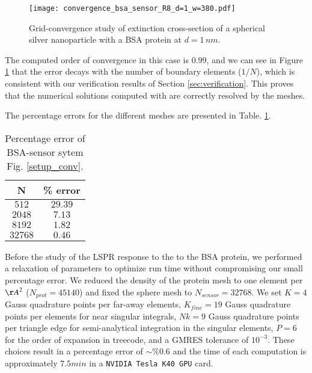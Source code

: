 \begin{figure}[h] %
   \centering
   \texttt{[image: convergence\_bsa\_sensor\_R8\_d=1\_w=380.pdf]} 
   \caption{Grid-convergence study of extinction cross-section of a spherical silver
            nanoparticle with a BSA protein at $d=1 \, nm$.}
   \label{fig:error_sphere-bsa}
\end{figure}

The computed order of convergence in this case is $0.99$, and we can see in 
Figure \ref{fig:error_sphere-bsa} that the error decays with the number
of boundary elements ($1/N$), which is consistent with our verification 
results of Section \ref{sec:verification}. This proves that the
numerical solutions computed with \pygbe are correctly resolved by the meshes.

The percentage errors for the different meshes are presented in Table. \ref{table:err_bsa_sensor}.

\begin{table}[h]
    \centering
    \caption{\label{table:err_bsa_sensor} Percentage error of BSA-sensor sytem Fig. \ref{setup_conv}.} 
    \begin{tabular}{c c}
    \hline%
    N & \% error \\
    \hline%
     $512$ & $29.39$ \\
     $2048$ & $7.13$ \\
     $8192$ & $1.82$ \\
     $32768$ & $0.46$ \\
    \hline%
    \end{tabular}
\end{table}

Before the study of the LSPR response to the to the BSA protein, we performed a 
relaxation of parameters to optimize run time without compromising our small
percentage error. We reduced the density of the protein mesh to one element per
${\AA}^2$ ($N_{prot}=45140$) and fixed the sphere mesh to $N_{sensor}=32768$. We
set $K=4$ Gauss quadrature points per far-away elements, $K_{fine} = 19$ Gauss
quadrature points per elements for near singular integrals, $Nk = 9$ Gauss 
quadrature points per triangle edge for semi-analytical integration in the 
singular elements, $P=6$ for the order of expansion in treecode, and a GMRES 
tolerance of $10^{-3}$. These choices result in a percentage error of $\sim\%0.6$
and the time of each computation is approximately $7.5 min$ in a \texttt{NVIDIA Tesla K40 GPU}
card. 



